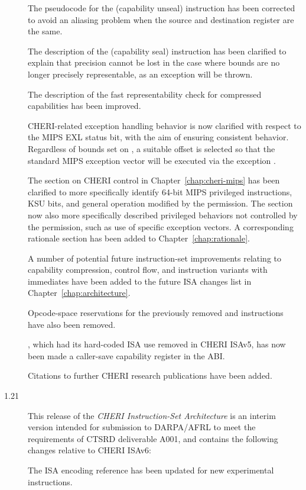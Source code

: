 \begin{description}
  The pseudocode for the  (capability unseal) instruction
  has been corrected to avoid an aliasing problem when the source and
  destination register are the same.

  The description of the  (capability seal) instruction has
  been clarified to explain that precision cannot be lost in the case where
  bounds are no longer precisely representable, as an exception will be thrown.

  The description of the fast representability check for compressed capabilities
  has been improved.

  CHERI-related exception handling behavior is now clarified with respect to the
  MIPS EXL status bit, with the aim of ensuring consistent behavior.
  Regardless of bounds set on \KCC{}, a suitable offset is selected so that the
  standard MIPS exception vector will be executed via the exception \PCC{}.

  The section on CHERI control in Chapter~\ref{chap:cheri-mips} has been
  clarified to more specifically identify 64-bit MIPS privileged instructions,
  KSU bits, and general operation modified by the \cappermASR
  permission.
  The section now also more specifically described privileged behaviors not
  controlled by the permission, such as use of specific exception vectors.
  A corresponding rationale section has been added to
  Chapter~\ref{chap:rationale}.

  A number of potential future instruction-set improvements relating to
  capability compression, control flow, and instruction variants with immediates
  have been added to the future ISA changes list in
  Chapter~\ref{chap:architecture}.

  Opcode-space reservations for the previously removed 
  and  instructions have also been removed.

  , which had its hard-coded ISA use removed in CHERI ISAv5, has now
  been made a caller-save capability register in the ABI.

  Citations to further CHERI research publications have been added.

\item[1.21] This release of the \textit{CHERI Instruction-Set Architecture} is
  an interim version intended for submission to DARPA/AFRL to meet the
  requirements of CTSRD deliverable A001, and contains the following changes
  relative to CHERI ISAv6:

  The ISA encoding reference has been updated for new experimental
  instructions.


\end{description}

